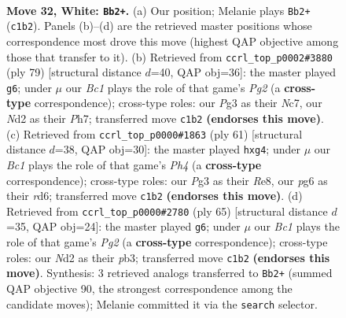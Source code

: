 \documentclass[11pt]{article}
\begin{document}
\clearpage

\begin{figure}[p]\centering
\begin{subfigure}{0.46\textwidth}\centering
\resizebox{\linewidth}{!}{%
\newchessgame
\chessboard[
  setfen={8/1R3pk1/2p3p1/2r4p/r6P/6P1/P2N3K/2B5 w - - 0 32},
  showmover=false,
  pgfstyle=straightmove, color=movearrow, markmove={c1-b2}
]}
\caption{}
\end{subfigure}\hfill
\begin{subfigure}{0.46\textwidth}\centering
\resizebox{\linewidth}{!}{%
\newchessgame
\chessboard[
  setfen={3r4/2n1kppp/8/1p6/6RP/3P2P1/3K1PB1/8 b - - 13 40},
  showmover=false,
  pgfstyle=straightmove, color=movearrow, markmove={g7-g6}
]}
\caption{}
\end{subfigure}
\\[4pt]
\begin{subfigure}{0.46\textwidth}\centering
\resizebox{\linewidth}{!}{%
\newchessgame
\chessboard[
  setfen={4r3/5pk1/3R4/3Pp2p/4R1P1/8/1r3P1P/6K1 b - - 0 31},
  showmover=false,
  pgfstyle=straightmove, color=movearrow, markmove={h5-g4}
]}
\caption{}
\end{subfigure}\hfill
\begin{subfigure}{0.46\textwidth}\centering
\resizebox{\linewidth}{!}{%
\newchessgame
\chessboard[
  setfen={1k6/2p3pp/pp3p2/8/1bP1r3/1P4R1/6PP/R6K b - - 1 33},
  showmover=false,
  pgfstyle=straightmove, color=movearrow, markmove={g7-g6}
]}
\caption{}
\end{subfigure}
\caption{\textbf{Move 32, White: \texttt{Bb2+}.} (a) Our position; Melanie plays \texttt{Bb2+} (\texttt{c1b2}). Panels (b)--(d) are the retrieved master positions whose correspondence most drove this move (highest QAP objective among those that transfer to it). (b) Retrieved from \texttt{ccrl\_top\_p0002\#3880} (ply 79) [structural distance $d$=40, QAP obj=36]: the master played \texttt{g6}; under $\mu$ our \emph{Bc1} plays the role of that game's \emph{Pg2} (a \textbf{cross-type} correspondence); cross-type roles: our \emph{P}g3 as their \emph{N}c7, our \emph{N}d2 as their \emph{P}h7; transferred move \texttt{c1b2} \textbf{(endorses this move)}. (c) Retrieved from \texttt{ccrl\_top\_p0000\#1863} (ply 61) [structural distance $d$=38, QAP obj=30]: the master played \texttt{hxg4}; under $\mu$ our \emph{Bc1} plays the role of that game's \emph{Ph4} (a \textbf{cross-type} correspondence); cross-type roles: our \emph{P}g3 as their \emph{R}e8, our \emph{p}g6 as their \emph{r}d6; transferred move \texttt{c1b2} \textbf{(endorses this move)}. (d) Retrieved from \texttt{ccrl\_top\_p0000\#2780} (ply 65) [structural distance $d$=35, QAP obj=24]: the master played \texttt{g6}; under $\mu$ our \emph{Bc1} plays the role of that game's \emph{Pg2} (a \textbf{cross-type} correspondence); cross-type roles: our \emph{N}d2 as their \emph{p}b3; transferred move \texttt{c1b2} \textbf{(endorses this move)}. Synthesis: 3 retrieved analogs transferred to \texttt{Bb2+} (summed QAP objective 90, the strongest correspondence among the candidate moves); Melanie committed it via the \texttt{search} selector.}
\label{fig:thought-m62}
\end{figure}
\end{document}
